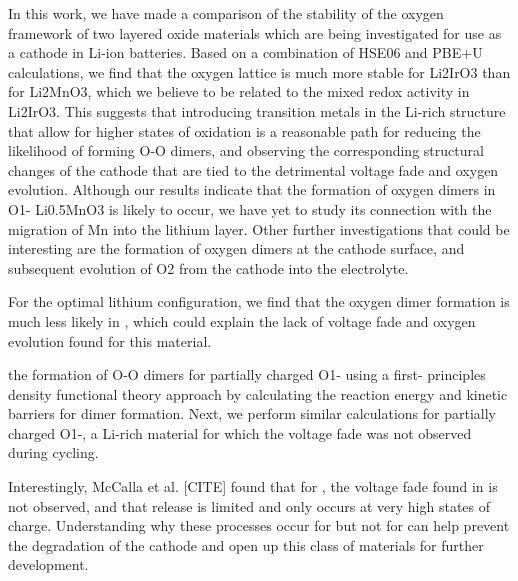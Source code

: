 \begin{refsection}
In this work, we have made a comparison of the stability of the oxygen framework of two layered oxide materials which are being investigated for use as a cathode in Li-ion batteries. Based on a combination of HSE06 and PBE+U calculations, we find that the oxygen lattice is much more stable for Li2IrO3 than for Li2MnO3, which we believe to be related to the mixed redox activity in Li2IrO3. This suggests that introducing transition metals in the Li-rich structure that allow for higher states of oxidation is a reasonable path for reducing the likelihood of forming O-O dimers, and observing the corresponding structural changes of the cathode that are tied to the detrimental voltage fade and oxygen evolution. Although our results indicate that the formation of oxygen dimers in O1- Li0.5MnO3 is likely to occur, we have yet to study its connection with the migration of Mn into the lithium layer. Other further investigations that could be interesting are the formation of oxygen dimers at the cathode surface, and subsequent evolution of O2 from the cathode into the electrolyte.

For the optimal lithium configuration, we find that the oxygen dimer formation is much less likely in , which could explain the lack of voltage fade and oxygen evolution found for this material.

the formation of O-O dimers for partially charged O1- using a first- principles density functional theory approach by calculating the reaction energy and kinetic barriers for dimer formation. Next, we perform similar calculations for partially charged O1-, a Li-rich material for which the voltage fade was not observed during cycling. 

Interestingly, McCalla et al. [CITE] found that for , the voltage fade found in  is not observed, and that  release is limited and only occurs at very high states of charge. Understanding why these processes occur for  but not for  can help prevent the degradation of the cathode and open up this class of materials for further development.

\printbibliography
\end{refsection}